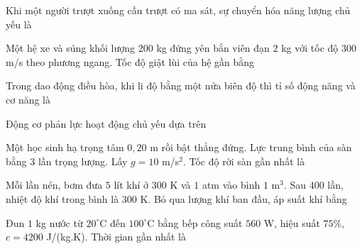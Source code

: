 \begin{ex}
Khi một người trượt xuống cầu trượt có ma sát, sự chuyển hóa năng lượng chủ yếu là
\end{ex}

\begin{ex}
Một hệ xe và súng khối lượng $200$ kg đứng yên bắn viên đạn $2$ kg với tốc độ $300$ m/s theo phương ngang. Tốc độ giật lùi của hệ gần bằng
\end{ex}

\begin{ex}
Trong dao động điều hòa, khi li độ bằng một nửa biên độ thì tỉ số động năng và cơ năng là
\end{ex}

\begin{ex}
Động cơ phản lực hoạt động chủ yếu dựa trên
\end{ex}

\begin{ex}
Một học sinh hạ trọng tâm $0{,}20$ m rồi bật thẳng đứng. Lực trung bình của sàn bằng $3$ lần trọng lượng. Lấy $g=10$ m/s$^2$. Tốc độ rời sàn gần nhất là
\end{ex}

\begin{ex}
Mỗi lần nén, bơm đưa $5$ lít khí ở $300$ K và $1$ atm vào bình $1$ m$^3$. Sau $400$ lần, nhiệt độ khí trong bình là $300$ K. Bỏ qua lượng khí ban đầu, áp suất khí bằng
\end{ex}

\begin{ex}
Đun $1$ kg nước từ $20^\circ$C đến $100^\circ$C bằng bếp công suất $560$ W, hiệu suất $75\%$, $c=4200$ J/(kg.K). Thời gian gần nhất là
\end{ex}

